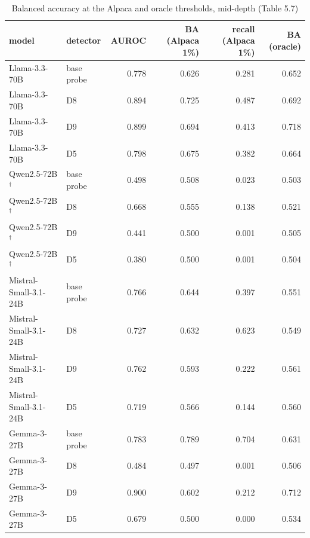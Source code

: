 \begin{table}
\caption{Balanced accuracy at the Alpaca and oracle thresholds, mid-depth (Table 5.7)}
\label{tab:x-calibration}
\begin{tabular}{llrrrr}
\toprule
model & detector & AUROC & BA (Alpaca 1\%) & recall (Alpaca 1\%) & BA (oracle) \\
\midrule
Llama-3.3-70B & base probe & 0.778 & 0.626 & 0.281 & 0.652 \\
Llama-3.3-70B & D8 & 0.894 & 0.725 & 0.487 & 0.692 \\
Llama-3.3-70B & D9 & 0.899 & 0.694 & 0.413 & 0.718 \\
Llama-3.3-70B & D5 & 0.798 & 0.675 & 0.382 & 0.664 \\
Qwen2.5-72B$^\dagger$ & base probe & 0.498 & 0.508 & 0.023 & 0.503 \\
Qwen2.5-72B$^\dagger$ & D8 & 0.668 & 0.555 & 0.138 & 0.521 \\
Qwen2.5-72B$^\dagger$ & D9 & 0.441 & 0.500 & 0.001 & 0.505 \\
Qwen2.5-72B$^\dagger$ & D5 & 0.380 & 0.500 & 0.001 & 0.504 \\
Mistral-Small-3.1-24B & base probe & 0.766 & 0.644 & 0.397 & 0.551 \\
Mistral-Small-3.1-24B & D8 & 0.727 & 0.632 & 0.623 & 0.549 \\
Mistral-Small-3.1-24B & D9 & 0.762 & 0.593 & 0.222 & 0.561 \\
Mistral-Small-3.1-24B & D5 & 0.719 & 0.566 & 0.144 & 0.560 \\
Gemma-3-27B & base probe & 0.783 & 0.789 & 0.704 & 0.631 \\
Gemma-3-27B & D8 & 0.484 & 0.497 & 0.001 & 0.506 \\
Gemma-3-27B & D9 & 0.900 & 0.602 & 0.212 & 0.712 \\
Gemma-3-27B & D5 & 0.679 & 0.500 & 0.000 & 0.534 \\
\bottomrule
\end{tabular}
\end{table}

